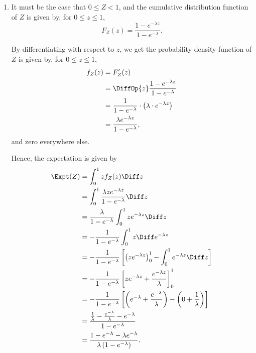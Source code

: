 \begin{enumerate}
    \item It must be the case that \(0 \leq Z < 1\), and the cumulative distribution function of \(Z\) is given by, for \(0 \leq z \leq 1\),
          \[
              F_{Z}(z) = \frac{1 - e^{-\lambda z}}{1 - e^{-\lambda}}.
          \]

          By differentiating with respect to \(z\), we get the probability density function of \(Z\) is given by, for \(0 \leq z \leq 1\),
          \begin{align*}
              f_{Z}(z) & = F'_{Z}(z)                                                                  \\
                       & = \DiffOp{z} \frac{1 - e^{-\lambda z}}{1 - e^{-\lambda}}                     \\
                       & = \frac{1}{1 - e^{-\lambda}} \cdot \left(\lambda \cdot e^{-\lambda z}\right) \\
                       & = \frac{\lambda e^{-\lambda z}}{1 - e^{-\lambda}},
          \end{align*}
          and zero everywhere else.

          Hence, the expectation is given by
          \begin{align*}
              \Expt(Z) & = \int_{0}^{1} z f_{Z} (z) \Diff z                                                                                                        \\
                       & = \int_{0}^{1} \frac{\lambda z e^{-\lambda z}}{1 - e^{-\lambda}} \Diff z                                                                  \\
                       & = \frac{\lambda}{1 - e^{-\lambda}} \int_{0}^{1} z e^{-\lambda z} \Diff z                                                                  \\
                       & = - \frac{1}{1 - e^{-\lambda}} \int_{0}^{1} z \Diff e^{-\lambda z}                                                                        \\
                       & = - \frac{1}{1 - e^{-\lambda}} \left[\left(z e^{-\lambda z}\right)_{0}^{1} - \int_{0}^{1} e^{-\lambda z} \Diff z\right]                   \\
                       & = - \frac{1}{1 - e^{-\lambda}} \left[z e^{-\lambda z} + \frac{e^{-\lambda z}}{\lambda}\right]_{0}^{1}                                     \\
                       & = - \frac{1}{1 - e^{-\lambda}} \left[\left(e^{-\lambda} + \frac{e^{-\lambda}}{\lambda}\right) - \left(0 + \frac{1}{\lambda}\right)\right] \\
                       & = \frac{\frac{1}{\lambda} - \frac{e^{-\lambda}}{\lambda} - e^{-\lambda}}{1 - e^{-\lambda}}                                                \\
                       & = \frac{1 - e^{-\lambda} - \lambda e^{-\lambda}}{\lambda \left(1 - e^{-\lambda}\right)}.
          \end{align*}


\end{enumerate}

